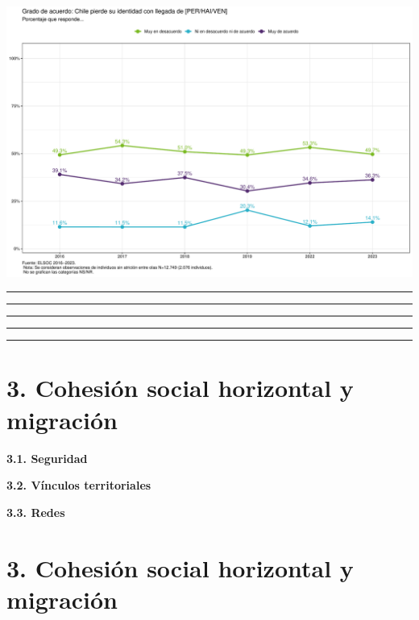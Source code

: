 \documentclass[
  spanish,
  letterpaper,
  DIV=11,
  numbers=noendperiod,
  oneside]{scrartcl}
\begin{document}
\begin{center}
\includegraphics[width=1\linewidth,height=\textheight,keepaspectratio]{cep_2025_files/figure-pdf/unnamed-chunk-2-1.pdf}
\end{center}

\begin{center}\rule{0.5\linewidth}{0.5pt}\end{center}

\begin{center}\rule{0.5\linewidth}{0.5pt}\end{center}

\begin{center}\rule{0.5\linewidth}{0.5pt}\end{center}

\begin{center}\rule{0.5\linewidth}{0.5pt}\end{center}

\begin{center}\rule{0.5\linewidth}{0.5pt}\end{center}

\section{3. Cohesión social horizontal y
migración}\label{cohesiuxf3n-social-horizontal-y-migraciuxf3n}

{\textbf{3.1. Seguridad}}

{\textbf{3.2. Vínculos territoriales}}

{\textbf{3.3. Redes}}

\section{3. Cohesión social horizontal y
migración}\label{cohesiuxf3n-social-horizontal-y-migraciuxf3n-1}
\end{document}

